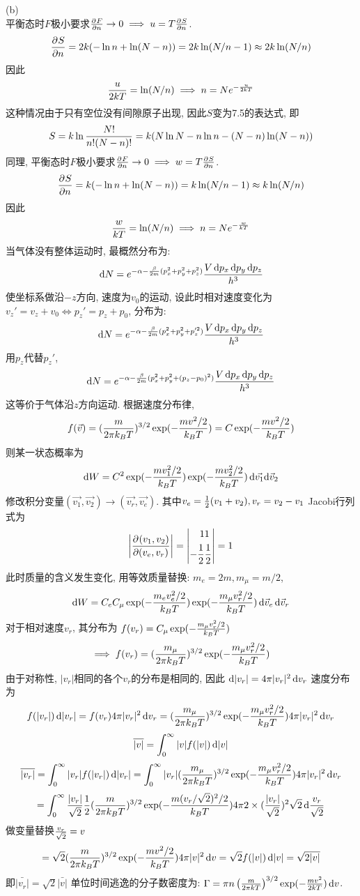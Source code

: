 \documentclass[UTF8,9pt]{ctexart}
\begin{document}
(b)\\
平衡态时$F$极小要求$\frac{\partial^{} F}{\partial {n}^{}} \to 0 \implies u=T\frac{\partial^{} S}{\partial {n}^{}} $. 
$$\frac{\partial^{} S}{\partial {n}^{}} = 2k(-\ln n+\ln(N-n)) = 2k\ln(N/n-1) \approx  2k\ln(N/n)$$
因此$$\frac{u}{2kT} = \ln(N/n) \implies n =Ne^{-\frac{u}{2kT}}$$
这种情况由于只有空位没有间隙原子出现, 因此$S$变为7.5的表达式, 即
$$S=k\ln\frac{N!}{n! (N-n)!} = k(N\ln N-n\ln n-(N-n)\ln (N-n))$$
同理, 平衡态时$F$极小要求$\frac{\partial^{} F}{\partial {n}^{}} \to 0 \implies w=T\frac{\partial^{} S}{\partial {n}^{}} $. 
$$\frac{\partial^{} S}{\partial {n}^{}} = k(-\ln n+\ln(N-n)) = k\ln(N/n-1) \approx  k\ln(N/n)$$
因此$$\frac{w}{kT} = \ln(N/n) \implies n =Ne^{-\frac{w}{kT}}$$
当气体没有整体运动时, 最概然分布为:
$$\mathop{}\!\mathrm{d} N = e^{-\alpha-\frac{\beta}{2m}(p_x^2+p_y^2+p_z^2)}\frac{V\mathop{}\!\mathrm{d} p_x\mathop{}\!\mathrm{d} p_y\mathop{}\!\mathrm{d} p_z}{h^3}$$
使坐标系做沿$-z$方向, 速度为$v_0$的运动, 设此时相对速度变化为$v_z' = v_z +v_0 \iff p_z' = p_z + p_0$, 分布为:
$$\mathop{}\!\mathrm{d} N = e^{-\alpha-\frac{\beta}{2m}(p_x^2+p_y^2+p_z'^2)}\frac{V\mathop{}\!\mathrm{d} p_x\mathop{}\!\mathrm{d} p_y\mathop{}\!\mathrm{d} p_z}{h^3}$$
用$p_z$代替$p_z'$,
$$\mathop{}\!\mathrm{d} N = e^{-\alpha-\frac{\beta}{2m}(p_x^2+p_y^2+(p_z-p_0)^2)}\frac{V\mathop{}\!\mathrm{d} p_x\mathop{}\!\mathrm{d} p_y\mathop{}\!\mathrm{d} p_z}{h^3}$$
这等价于气体沿$z$方向运动.
根据速度分布律, 
$$f(\vec{v}) = (\frac{m}{2\pi k_BT})^{3/2}\exp (-\frac{mv^2/2}{k_BT})=C \exp (-\frac{mv^2/2}{k_BT})$$
则某一状态概率为
$$\mathop{}\!\mathrm{d} W = C^2 \exp (-\frac{mv_1^2/2}{k_BT})\exp (-\frac{mv_2^2/2}{k_BT})\mathop{}\!\mathrm{d}\vec{v_1}{\mathop{}\!\mathrm{d}\vec{v}_2}$$
修改积分变量$(\vec{v_1},\vec{v_2})\to(\vec{v_r},\vec{v_e})$. 其中$v_e=\frac{1}{2}(v_1+v_2), v_r = v_2-v_1$
Jacobi行列式为$$\left| \frac{\partial^{} (v_1,v_2)}{\partial {(v_e,v_r)}^{}} \right| = \left| \begin{aligned} 1&1\\-\frac{1}{2}&\frac{1}{2} \end{aligned} \right|=1$$
此时质量的含义发生变化, 用等效质量替换: $m_e=2m,m_\mu = m/2$, 
$$\mathop{}\!\mathrm{d} W = C_eC_\mu \exp (-\frac{m_ev_e^2/2}{k_BT})\exp (-\frac{m_\mu v_r^2/2}{k_BT})\mathop{}\!\mathrm{d} \vec{v}_e\mathop{}\!\mathrm{d} \vec{v}_r$$
对于相对速度$v_r$, 其分布为
$f(v_r)=C_\mu\exp (-\frac{m_\mu v_r^2/2}{k_BT})$
$$\implies f(v_r)=(\frac{m_\mu}{2\pi k_BT})^{3/2}\exp (-\frac{m_\mu v_r^2/2}{k_BT})$$
由于对称性, $|v_r|$相同的各个$v_r$的分布是相同的, 因此
$\mathop{}\!\mathrm{d}|v_r| = 4\pi |v_r|^2\mathop{}\!\mathrm{d} v_r$
速度分布为
$$f(|v_r|)\mathop{}\!\mathrm{d}|v_r| = f(v_r) 4\pi |v_r|^2\mathop{}\!\mathrm{d} v_r=(\frac{m_\mu}{2\pi k_BT})^{3/2}\exp (-\frac{m_\mu v_r^2/2}{k_BT}) 4\pi |v_r|^2\mathop{}\!\mathrm{d} v_r$$
$$\overline{|v|} = \int_0^\infty |v|f(|v|)\mathop{}\!\mathrm{d}|v|$$
$$\overline{|v_r|} = \int_0^\infty |v_r|f(|v_r|)\mathop{}\!\mathrm{d}|v_r| =\int_0^\infty |v_r|(\frac{m_\mu}{2\pi k_BT})^{3/2}\exp (-\frac{m_\mu v_r^2/2}{k_BT}) 4\pi |v_r|^2\mathop{}\!\mathrm{d} v_r$$
$$ = \int_0^\infty \frac{|v_r|}{\sqrt{2}}\frac{1}{2}(\frac{m}{2\pi k_BT})^{3/2}\exp (-\frac{m (v_r/\sqrt{2})^2/2}{k_BT}) 4\pi 2\times(\frac{|v_r|}{\sqrt{2}})^2\sqrt{2}\mathop{}\!\mathrm{d} \frac{v_r}{\sqrt{2}}$$
做变量替换$\frac{v_r}{\sqrt{2}} = v$
$$ = \sqrt{2}(\frac{m}{2\pi k_BT})^{3/2}\exp (-\frac{m v^2/2}{k_BT}) 4\pi |v|^2\mathop{}\!\mathrm{d} v = \sqrt{2}f(|v|)\mathop{}\!\mathrm{d} |v| = \sqrt{2}\overline{|v|}$$
即$\bar{|v_r|} = \sqrt{2}\bar{|v|}$
单位时间逃逸的分子数密度为: $\Gamma = \pi  n \left( \frac{m}{2\pi kT} \right)^{3/2} \exp(-\frac{mv^2}{2kT}) \mathop{}\!\mathrm{d} v$. \\
\end{document}
